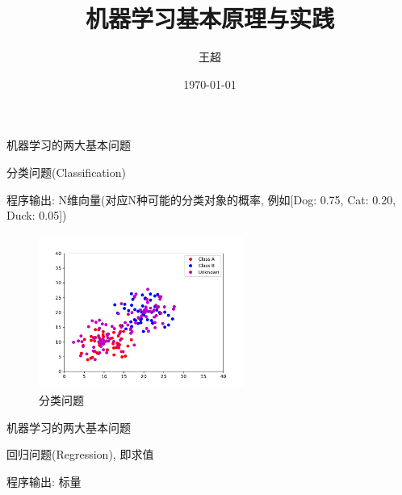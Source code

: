 \documentclass{beamer}
\title{机器学习基本原理与实践}
\author{王超}
\institute{}
\date{\today}
\begin{document}
\frame{\titlepage}


\begin{frame} {机器学习的两大基本问题} 

\begin{block}{分类问题(Classification)}
    {
    程序输出: N维向量(对应N种可能的分类对象的概率, 例如[Dog: 0.75, Cat: 0.20, Duck: 0.05])
    \begin{figure}
    \begin{center}
    \includegraphics[width=0.6\textwidth]{fig/classification.pdf}
    \caption{分类问题}
    \end{center}
    \end{figure}
    }
\end{block}

\end{frame}



\begin{frame} {机器学习的两大基本问题} 

\begin{block}{回归问题(Regression), 即求值}
    {
    程序输出: 标量

    }
\end{block}

\end{frame}
\end{document}
